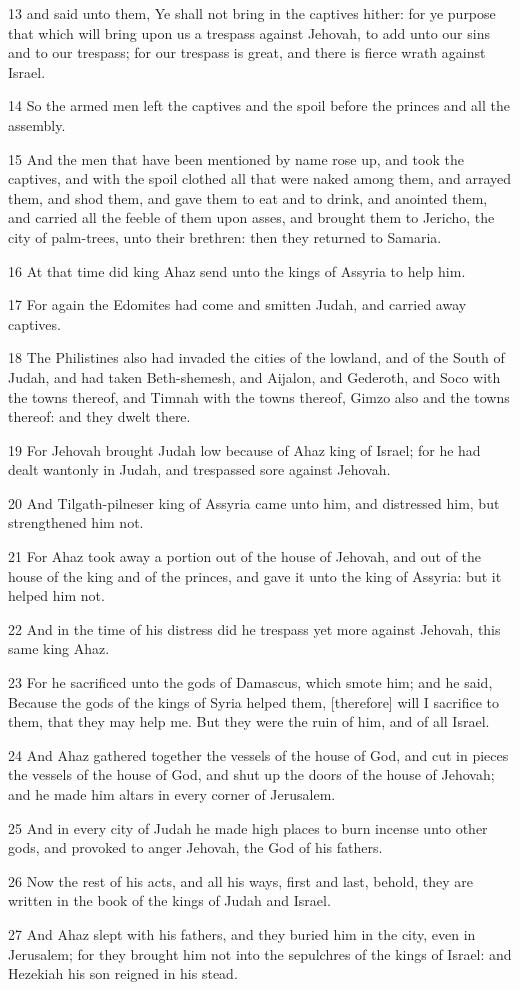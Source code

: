 \par 13 and said unto them, Ye shall not bring in the captives hither: for ye purpose that which will bring upon us a trespass against Jehovah, to add unto our sins and to our trespass; for our trespass is great, and there is fierce wrath against Israel.
\par 14 So the armed men left the captives and the spoil before the princes and all the assembly.
\par 15 And the men that have been mentioned by name rose up, and took the captives, and with the spoil clothed all that were naked among them, and arrayed them, and shod them, and gave them to eat and to drink, and anointed them, and carried all the feeble of them upon asses, and brought them to Jericho, the city of palm-trees, unto their brethren: then they returned to Samaria.
\par 16 At that time did king Ahaz send unto the kings of Assyria to help him.
\par 17 For again the Edomites had come and smitten Judah, and carried away captives.
\par 18 The Philistines also had invaded the cities of the lowland, and of the South of Judah, and had taken Beth-shemesh, and Aijalon, and Gederoth, and Soco with the towns thereof, and Timnah with the towns thereof, Gimzo also and the towns thereof: and they dwelt there.
\par 19 For Jehovah brought Judah low because of Ahaz king of Israel; for he had dealt wantonly in Judah, and trespassed sore against Jehovah.
\par 20 And Tilgath-pilneser king of Assyria came unto him, and distressed him, but strengthened him not.
\par 21 For Ahaz took away a portion out of the house of Jehovah, and out of the house of the king and of the princes, and gave it unto the king of Assyria: but it helped him not.
\par 22 And in the time of his distress did he trespass yet more against Jehovah, this same king Ahaz.
\par 23 For he sacrificed unto the gods of Damascus, which smote him; and he said, Because the gods of the kings of Syria helped them, [therefore] will I sacrifice to them, that they may help me. But they were the ruin of him, and of all Israel.
\par 24 And Ahaz gathered together the vessels of the house of God, and cut in pieces the vessels of the house of God, and shut up the doors of the house of Jehovah; and he made him altars in every corner of Jerusalem.
\par 25 And in every city of Judah he made high places to burn incense unto other gods, and provoked to anger Jehovah, the God of his fathers.
\par 26 Now the rest of his acts, and all his ways, first and last, behold, they are written in the book of the kings of Judah and Israel.
\par 27 And Ahaz slept with his fathers, and they buried him in the city, even in Jerusalem; for they brought him not into the sepulchres of the kings of Israel: and Hezekiah his son reigned in his stead.

